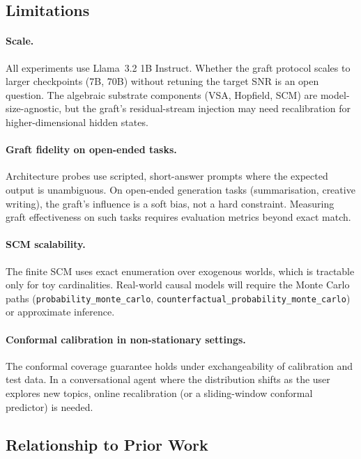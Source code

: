 \subsection{Limitations}

\paragraph{Scale.}
All experiments use Llama~3.2 1B Instruct.  Whether the graft protocol scales
to larger checkpoints (7B, 70B) without retuning the target SNR is an open
question.  The algebraic substrate components (VSA, Hopfield, SCM) are
model-size-agnostic, but the graft's residual-stream injection may need
recalibration for higher-dimensional hidden states.

\paragraph{Graft fidelity on open-ended tasks.}
Architecture probes use scripted, short-answer prompts where the expected output
is unambiguous.  On open-ended generation tasks (summarisation, creative
writing), the graft's influence is a soft bias, not a hard constraint.
Measuring graft effectiveness on such tasks requires evaluation metrics beyond
exact match.

\paragraph{SCM scalability.}
The finite SCM uses exact enumeration over exogenous worlds, which is
tractable only for toy cardinalities.  Real-world causal models will require
the Monte Carlo paths (\texttt{probability\_monte\_carlo},
\texttt{counterfactual\_probability\_monte\_carlo}) or approximate inference.

\paragraph{Conformal calibration in non-stationary settings.}
The conformal coverage guarantee holds under exchangeability of calibration
and test data.  In a conversational agent where the distribution shifts as the
user explores new topics, online recalibration (or a sliding-window conformal
predictor) is needed.

\subsection{Relationship to Prior Work}

